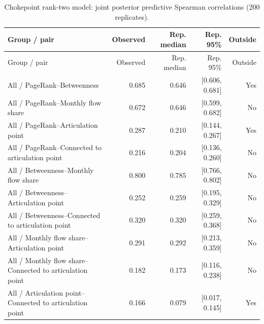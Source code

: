 \documentclass[pdftex,12pt,openright,a4paper,oneside]{book}
\begin{document}
\begin{longtable}{@{}p{}rrrr@{}}

\caption{Chokepoint rank-two model: joint posterior predictive Spearman correlations (200 replicates).}\label{tab:chokepoint_rank2_ppc_joint}\\

\toprule

Group / pair & Observed & Rep. median & Rep. 95\% & Outside \\

\midrule\endfirsthead

\toprule

Group / pair & Observed & Rep. median & Rep. 95\% & Outside \\

\midrule\endhead

All / PageRank--Betweenness & 0.685 & 0.646 & [0.606, 0.681] & Yes \\

All / PageRank--Monthly flow share & 0.672 & 0.646 & [0.599, 0.682] & No \\

All / PageRank--Articulation point & 0.287 & 0.210 & [0.144, 0.267] & Yes \\

All / PageRank--Connected to articulation point & 0.216 & 0.204 & [0.136, 0.260] & No \\

All / Betweenness--Monthly flow share & 0.800 & 0.785 & [0.766, 0.802] & No \\

All / Betweenness--Articulation point & 0.252 & 0.259 & [0.195, 0.329] & No \\

All / Betweenness--Connected to articulation point & 0.320 & 0.320 & [0.259, 0.368] & No \\

All / Monthly flow share--Articulation point & 0.291 & 0.292 & [0.213, 0.359] & No \\

All / Monthly flow share--Connected to articulation point & 0.182 & 0.173 & [0.116, 0.238] & No \\

All / Articulation point--Connected to articulation point & 0.166 & 0.079 & [0.017, 0.145] & Yes \\

\bottomrule\end{longtable}
\end{document}
